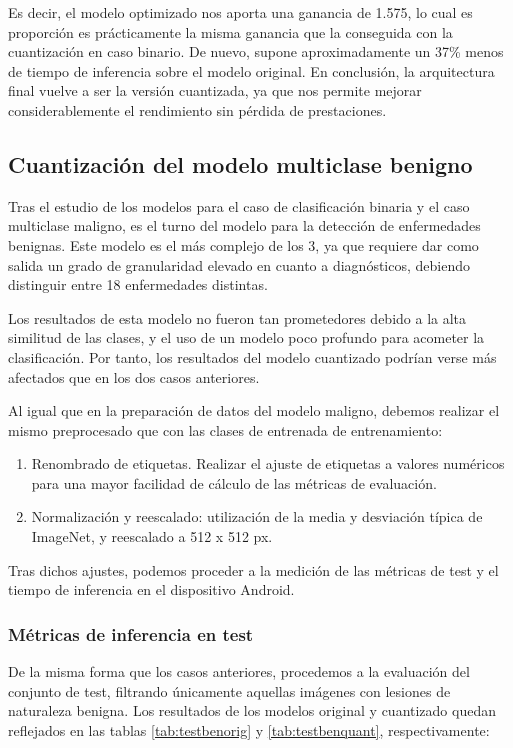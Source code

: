 Es decir, el modelo optimizado nos aporta una ganancia de 1.575, lo cual es proporción es prácticamente la misma ganancia que la conseguida con la cuantización en caso binario. De nuevo, supone aproximadamente un 37\% menos de tiempo de inferencia sobre el modelo original. 
En conclusión, la arquitectura final vuelve a ser la versión cuantizada, ya que nos permite mejorar considerablemente el rendimiento sin pérdida de prestaciones.

\subsection{Cuantización del modelo multiclase benigno}

Tras el estudio de los modelos para el caso de clasificación binaria y el caso multiclase maligno, es el turno del modelo para la detección de enfermedades benignas. Este modelo es el más complejo de los 3, ya que requiere dar como salida un grado de granularidad elevado en cuanto a diagnósticos, debiendo distinguir entre 18 enfermedades distintas.

Los resultados de esta modelo no fueron tan prometedores debido a la alta similitud de las clases, y el uso de un modelo poco profundo para acometer la clasificación. Por tanto, los resultados del modelo cuantizado podrían verse más afectados que en los dos casos anteriores.

Al igual que en la preparación de datos del modelo maligno, debemos realizar el mismo preprocesado que con las clases de entrenada de entrenamiento:

\begin{enumerate}
	\item Renombrado de etiquetas. Realizar el ajuste de etiquetas a valores numéricos para una mayor facilidad de cálculo de las métricas de evaluación.
	\item Normalización y reescalado: utilización de la media y desviación típica de ImageNet\cite{5206848}, y reescalado a 512 x 512 px.
\end{enumerate}

Tras dichos ajustes, podemos proceder a la medición de las métricas de test y el tiempo de inferencia en el dispositivo Android.

\subsubsection{Métricas de inferencia en test}

De la misma forma que los casos anteriores, procedemos a la evaluación del conjunto de test, filtrando únicamente aquellas imágenes con lesiones de naturaleza benigna. Los resultados de los modelos original y cuantizado quedan reflejados en las tablas \ref{tab:testbenorig} y \ref{tab:testbenquant}, respectivamente:

